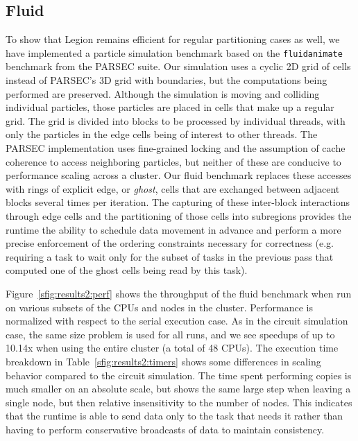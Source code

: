 

\subsection{Fluid}

To show that Legion remains efficient for regular partitioning cases as well,
we have implemented a particle simulation benchmark based on the
{\tt fluidanimate} benchmark from the PARSEC \cite{bienia11benchmarking} suite.
Our simulation uses a cyclic 2D grid of cells instead of PARSEC's 3D grid with
boundaries, but the computations being performed are preserved.
Although the 
simulation is moving and colliding individual particles, those particles
are placed in cells that make up a regular grid.  The grid is
divided into blocks to be processed by individual threads, with only the
particles in the edge cells being of interest to other threads.  The PARSEC
implementation uses fine-grained locking and the assumption of cache
coherence to access neighboring particles, but neither of these are conducive
to performance scaling across a cluster.  Our fluid benchmark replaces these
accesses with rings of
explicit edge, or \emph{ghost}, cells that are exchanged between adjacent
blocks several times per iteration.  The capturing of these inter-block
interactions through edge cells and the partitioning of those cells into
subregions provides the runtime the ability to schedule data movement in
advance and perform a more precise enforcement of the ordering
constraints necessary for correctness (e.g.
requiring a task to wait only for the subset of tasks in the previous pass 
that computed one of the ghost cells being read by this task).

Figure~\ref{sfig:results2:perf} shows the throughput of the fluid benchmark when
run on various subsets of the CPUs and nodes in the cluster.  Performance is
normalized with respect to the serial execution case.  As in the circuit
simulation case, the same size problem is used for all runs, and we see 
speedups of up to 10.14x when using the entire cluster (a total of 48 CPUs).
The execution time breakdown in Table~\ref{sfig:results2:timers} shows some
differences in scaling behavior compared to the circuit simulation.  The time
spent performing copies is much smaller on an absolute scale, but shows the same
large step when leaving a single node, but then relative insensitivity to the
number of nodes.  This indicates that the runtime is able to send data only to
the task that needs it rather than having to perform conservative broadcasts of
data to maintain consistency.

